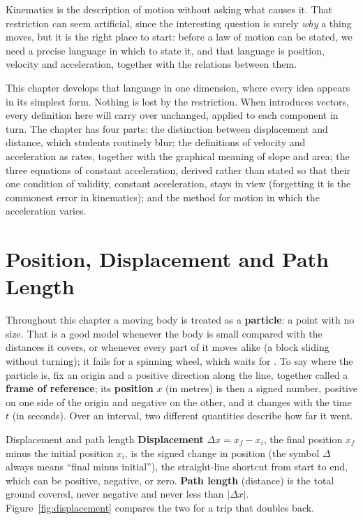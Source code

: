 \label{ch:straightline}

Kinematics is the description of motion without asking what causes it. That restriction can seem
artificial, since the interesting question is surely \emph{why} a thing moves, but it is the right
place to start: before a law of motion can be stated, we need a precise language in which to state it,
and that language is position, velocity and acceleration, together with the relations between them.

This chapter develops that language in one dimension, where every idea appears in its simplest form.
Nothing is lost by the restriction. When  introduces vectors, every definition here will carry
over unchanged, applied to each component in turn. The chapter has four parts: the distinction
between displacement and distance, which students routinely blur; the definitions of velocity and
acceleration as rates, together with the graphical meaning of slope and area; the three equations
of constant acceleration, derived rather than stated so that their one condition of validity,
constant acceleration, stays in view (forgetting it is the commonest error in kinematics); and the method for motion in which the acceleration varies.

\section{Position, Displacement and Path Length}

Throughout this chapter a moving body is treated as a \textbf{particle}: a point with no size. That is
a good model whenever the body is small compared with the distances it covers, or whenever every part of
it moves alike (a block sliding without turning); it fails for a spinning wheel, which waits for
. To say where the particle is, fix an origin and a positive direction along the line,
together called a \textbf{frame of reference}; its \textbf{position} $x$ (in metres) is then a signed
number, positive on one side of the origin and negative on the other, and it changes with the time $t$
(in seconds). Over an interval, two different quantities describe how far it went.

\begin{defbox}{Displacement and path length}
\textbf{Displacement} $\Delta x=x_f-x_i$, the final position $x_f$ minus the initial position $x_i$, is
the signed change in position (the symbol $\Delta$ always means ``final minus initial''), the straight-line shortcut
from start to end, which can be positive, negative, or zero. \textbf{Path length} (distance) is the
total ground covered, never negative and never less than $|\Delta x|$. Figure~\ref{fig:displacement}
compares the two for a trip that doubles back.
\end{defbox}

